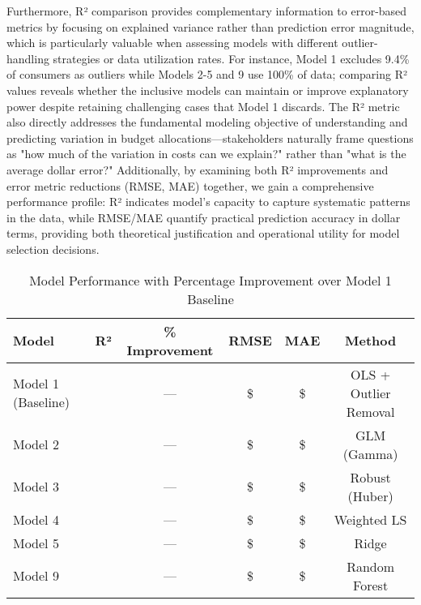 Furthermore, R² comparison provides complementary information to error-based metrics by focusing on explained variance rather than prediction error magnitude, which is particularly valuable when assessing models with different outlier-handling strategies or data utilization rates. For instance, Model 1 excludes 9.4\% of consumers as outliers while Models 2-5 and 9 use 100\% of data; comparing R² values reveals whether the inclusive models can maintain or improve explanatory power despite retaining challenging cases that Model 1 discards. The R² metric also directly addresses the fundamental modeling objective of understanding and predicting variation in budget allocations—stakeholders naturally frame questions as "how much of the variation in costs can we explain?" rather than "what is the average dollar error?" Additionally, by examining both R² improvements and error metric reductions (RMSE, MAE) together, we gain a comprehensive performance profile: R² indicates model's capacity to capture systematic patterns in the data, while RMSE/MAE quantify practical prediction accuracy in dollar terms, providing both theoretical justification and operational utility for model selection decisions.


\begin{table}[h!]
\centering
\caption{Model Performance with Percentage Improvement over Model 1 Baseline}
\label{tab:comparison_with_improvements}
\begin{tabular}{lccccc}
\toprule
\textbf{Model} & \textbf{R²} & \textbf{\% Improvement} & \textbf{RMSE} & \textbf{MAE} & \textbf{Method} \\
\midrule
Model 1 (Baseline) & \ModelOneRSquaredTest{} & --- & \$\ModelOneRMSETest{} & \$\ModelOneMAETest{} & OLS + Outlier Removal \\
\midrule
Model 2 & \ModelTwoRSquaredTest{} & --- & \$\ModelTwoRMSETest{} & \$\ModelTwoMAETest{} & GLM (Gamma) \\
Model 3 & \ModelThreeRSquaredTest{} & --- & \$\ModelThreeRMSETest{} & \$\ModelThreeMAETest{} & Robust (Huber) \\
Model 4 & \ModelFourRSquaredTest{} & --- & \$\ModelFourRMSETest{} & \$\ModelFourMAETest{} & Weighted LS \\
Model 5 & \ModelFiveRSquaredTest{} & --- & \$\ModelFiveRMSETest{} & \$\ModelFiveMAETest{} & Ridge \\
Model 9 & \ModelNineRSquaredTest{} & --- & \$\ModelNineRMSETest{} & \$\ModelNineMAETest{} & Random Forest \\
\bottomrule
\end{tabular}
\end{table}

